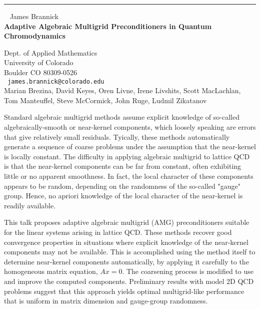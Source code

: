\documentclass{report}
\begin{document}
\begin{center}

\rule{6in}{1pt} \
{\large
James Brannick
\\ {\bf
Adaptive Algebraic Multigrid Preconditioners in Quantum Chromodynamics
}}

Dept. of Applied Mathematics
\\
University of Colorado
\\
Boulder CO 80309-0526
\\ {\tt
james.brannick@colorado.edu
}
\\
Marian Brezina, David Keyes, Oren Livne,
Irene Livshits, Scott MacLachlan, Tom Manteuffel,
Steve McCormick, John Ruge, Ludmil Zikatanov
\end{center}


Standard algebraic multigrid methods assume explicit knowledge of
so-called algebraically-smooth or near-kernel components, which loosely
speaking are errors that give relatively small residuals.  Tyically,
these methods automatically generate a sequence of coarse problems
under the assumption that the near-kernel is locally constant.  The
difficulty in applying algebraic multigrid to lattice QCD is that the
near-kernel components can be far from constant, often exhibiting
little or no apparent smoothness. In fact, the local character of these
components appears to be random, depending on the randomness of the
so-called "gauge" group. Hence, no apriori knowledge of the local
character of the near-kernel is readily available.

This talk proposes adaptive algebraic multigrid (AMG) preconditioners
suitable for the linear systems arising in lattice QCD.  These methods
recover good convergence properties in situations where explicit
knowledge of the near-kernel components may not be available.  This is
accomplished using the method itself to determine near-kernel
components automatically, by applying it carefully to the homogeneous
matrix equation, $Ax=0$.  The coarsening process is modified to use and
improve the computed components. Preliminary results with model 2D QCD
problems suggest that this approach yields optimal multigrid-like
performance that is uniform in matrix dimension and gauge-group
randomness.
\end{document}
